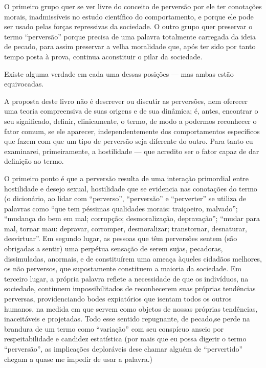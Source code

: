 O primeiro grupo quer se ver livre do conceito de perversão por ele
ter conotações morais,\idxpervconot{} inadmissíveis no estudo científico do
comportamento, e porque ele pode ser usado pelas forças repressivas da
sociedade. O outro grupo quer preservar o termo
``perversão'' porque precisa de uma palavra
totalmente carregada da ideia de pecado,\idxpervpecad{} para assim preservar a velha
moralidade que, após ter sido por tanto tempo posta à prova, continua a\idxpervaspec[|)]
constituir o pilar da sociedade.

Existe alguma verdade em cada uma dessas posições --- mas ambas estão
equivocadas.

A proposta deste livro não é descrever ou discutir as perversões,
nem oferecer uma teoria compreensiva de suas origens e de sua dinâmica;
é, antes, encontrar o seu significado, definir, clinicamente, o termo,
de modo a podermos reconhecer o fator comum, se ele aparecer,
independentemente dos comportamentos específicos que fazem com que um
tipo de perversão seja diferente do outro. Para tanto eu examinarei,
primeiramente, a hostilidade\idxhost{} --- que acredito ser o fator capaz de dar
definição ao termo.

O primeiro ponto é que a perversão resulta de uma interação
primordial entre hostilidade e desejo sexual, hostilidade que se
evidencia nas conotações do termo\idxpervconot{} (o dicionário, ao lidar com
``perverso'', ``perversão'' e ``perverter'' se utiliza de palavras como
``que tem péssimas qualidades morais: traiçoeiro, malvado''; ``mudança do bem em mal;
corrupção; desmoralização, depravação''; ``mudar para mal, tornar mau: depravar, corromper,
desmoralizar; transtornar, desnaturar, desvirtuar''.
Em segundo lugar, as pessoas que têm perversões sentem (são
obrigadas a sentir) uma perpétua sensação de serem sujas, pecadoras,\idxpervpecad{}
dissimuladas, anormais, e de constituírem uma ameaça àqueles cidadãos
melhores, os não perversos, que supostamente constituem a maioria da
sociedade. Em terceiro lugar, a própria palavra reflete a necessidade
de que os indivíduos, na sociedade, continuem impossibilitados de
reconhecerem suas próprias tendências perversas, providenciando bodes
expiatórios\idxbodex{} que isentam todos os outros humanos, na medida em que
servem como objetos de nossas próprias tendências, inaceitáveis e
projetadas. Todo esse sentido repugnante, de pecado,\idxpecad[|)] se perde na
brandura de um termo como ``variação''\idxvaria{} com
seu conspícuo anseio por respeitabilidade e candidez estatística (por
mais que eu possa digerir o termo
``perversão'', as implicações deploráveis de\idxaspec[|)]
se chamar alguém de ``pervertido'' chegam a
quase me impedir de usar a palavra.)

